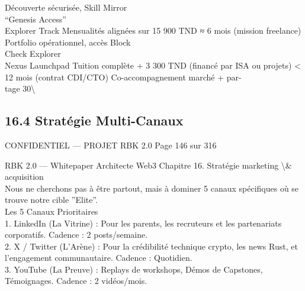 Découverte sécurisée, Skill Mirror\\
“Genesis Access”\\
Explorer Track  Mensualités alignées sur 15 900 TND                       ≈ 6 mois (mission freelance) Portfolio opérationnel, accès Block\\
Check Explorer\\
Nexus Launchpad Tuition complète + 3 300 TND (financé par ISA ou projets) \textless{} 12 mois (contrat CDI/CTO) Co-accompagnement marché + par-\\
tage 30\textbackslash{}%
\vspace{0.5em}
\vspace{0.5em}
\vspace{0.5em}
\vspace{0.5em}
\subsection{16.4 Stratégie Multi-Canaux}
\vspace{0.5em}
\begin{confidential}CONFIDENTIEL — PROJET RBK 2.0                                    Page 146 sur 316\end{confidential}
RBK 2.0 — Whitepaper Architecte Web3                                                             Chapitre 16. Stratégie marketing \textbackslash{}& acquisition\\
\vspace{0.5em}
\vspace{0.5em}
\vspace{0.5em}
Nous ne cherchons pas à être partout, mais à dominer 5 canaux spécifiques où se trouve notre cible ”Elite”.\\
\vspace{0.5em}
Les 5 Canaux Prioritaires\\
\vspace{0.5em}
1. LinkedIn (La Vitrine) : Pour les parents, les recruteurs et les partenariats corporatifs. Cadence : 2 posts/semaine.\\
\vspace{0.5em}
2. X / Twitter (L’Arène) : Pour la crédibilité technique crypto, les news Rust, et l’engagement communautaire. Cadence : Quotidien.\\
\vspace{0.5em}
3. YouTube (La Preuve) : Replays de workshops, Démos de Capstones, Témoignages. Cadence : 2 vidéos/mois.\\
\vspace{0.5em}
